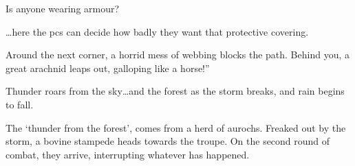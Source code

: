 \begin{multicols}{2}
\begin{exampletext}
\begin{speechtext}
    Is anyone wearing armour?
  \end{speechtext}

  \ldots here the \glspl{pc} can decide how badly they want that protective covering.

  \begin{speechtext}
    Around the next corner, a horrid mess of webbing blocks the path.
    Behind you, a great arachnid leaps out, galloping like a horse!''

    Thunder roars from the sky\ldots and the forest as the storm breaks, and rain begins to fall.
  \end{speechtext}

  The `thunder from the forest', comes from a herd of aurochs.
  Freaked out by the storm, a bovine stampede heads towards the troupe.
  On the second round of combat, they arrive, interrupting whatever has happened.

\end{exampletext}

\end{multicols}

\bigLine

